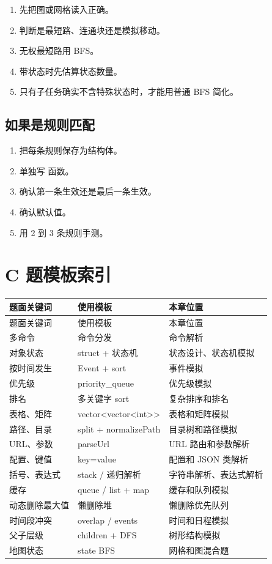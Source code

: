 \begin{enumerate}
  \item 先把图或网格读入正确。
  \item 判断是最短路、连通块还是模拟移动。
  \item 无权最短路用 BFS。
  \item 带状态时先估算状态数量。
  \item 只有子任务确实不含特殊状态时，才能用普通 BFS 简化。
\end{enumerate}

\subsection{如果是规则匹配}

\begin{enumerate}
  \item 把每条规则保存为结构体。
  \item 单独写  函数。
  \item 确认第一条生效还是最后一条生效。
  \item 确认默认值。
  \item 用 2 到 3 条规则手测。
\end{enumerate}

\section{C 题模板索引}\label{sec:07-40}

\begin{longtable}{p{4cm}p{5cm}p{5cm}}
\toprule
题面关键词 & 使用模板 & 本章位置 \\
\midrule
\endfirsthead
\toprule
题面关键词 & 使用模板 & 本章位置 \\
\midrule
\endhead
多命令 & 命令分发 & 命令解析 \\
对象状态 & struct + 状态机 & 状态设计、状态机模拟 \\
按时间发生 & Event + sort & 事件模拟 \\
优先级 & priority\_queue & 优先级模拟 \\
排名 & 多关键字 sort & 复杂排序和排名 \\
表格、矩阵 & vector<vector<int>> & 表格和矩阵模拟 \\
路径、目录 & split + normalizePath & 目录树和路径模拟 \\
URL、参数 & parseUrl & URL 路由和参数解析 \\
配置、键值 & key=value & 配置和 JSON 类解析 \\
括号、表达式 & stack / 递归解析 & 字符串解析、表达式解析 \\
缓存 & queue / list + map & 缓存和队列模拟 \\
动态删除最大值 & 懒删除堆 & 懒删除优先队列 \\
时间段冲突 & overlap / events & 时间和日程模拟 \\
父子层级 & children + DFS & 树形结构模拟 \\
地图状态 & state BFS & 网格和图混合题 \\
\bottomrule
\end{longtable}

